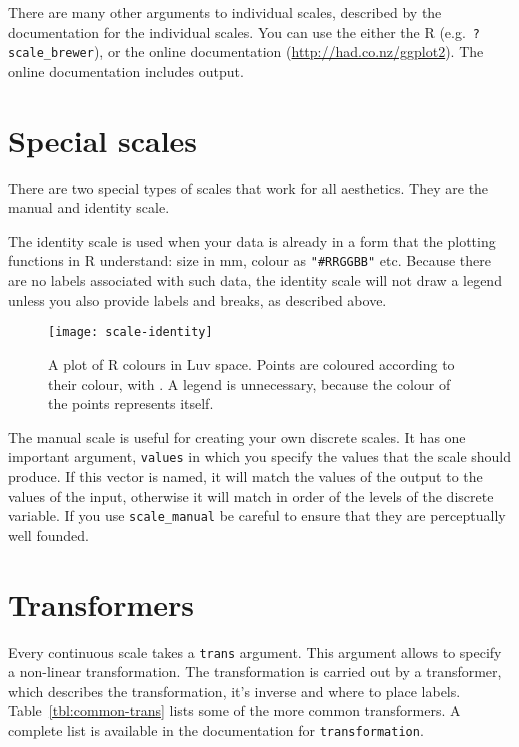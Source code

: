 There are many other arguments to individual scales, described by the documentation for the individual scales.  You can use the either the R (e.g.\ {\tt ?scale_brewer}), or the online documentation (\url{http://had.co.nz/ggplot2}).  The online documentation includes output.

\section{Special scales}
\label{sec:scale_special}

There are two special types of scales that work for all aesthetics.  They are the manual and identity scale.  

The identity scale is used when your data is already in a form that the plotting functions in R understand: size in mm, colour as \verb|"#RRGGBB"| etc. Because there are no labels associated with such data, the identity scale will not draw a legend unless you also provide labels and breaks, as described above. 

\begin{figure}[htbp]
  \centering
    \texttt{[image: scale-identity]}
  \caption{A plot of R colours in Luv space.  Points are coloured according to their colour, with .  A legend is unnecessary, because the colour of the points represents itself.}
  \label{fig:scale-identity}
\end{figure}

The manual scale is useful for creating your own discrete scales.  It has one important argument, \verb|values| in which you specify the values that the scale should produce.  If this vector is named, it will match the values of the output to the values of the input, otherwise it will match in order of the levels of the discrete variable.  If you use \verb|scale_manual| be careful to ensure that they are perceptually well founded.

\section{Transformers}
\label{sec:trans}

Every continuous scale takes a {\tt trans} argument.  This argument allows to specify a non-linear transformation.  The transformation is carried out by a transformer, which describes the transformation, it's inverse and where to place labels. Table~\ref{tbl:common-trans} lists some of the more common transformers. A complete list is available in the documentation for {\tt transformation}.

